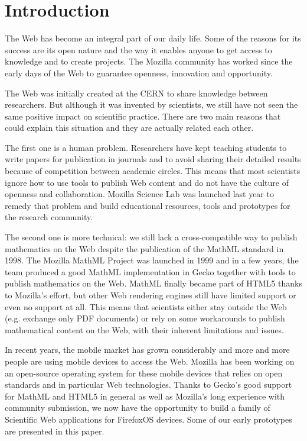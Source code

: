 \chapter*{Introduction}

The Web has become an integral part of our daily life. Some of the reasons for
its success are its open nature and the way it enables anyone to get access to
knowledge and to create projects. The Mozilla community has worked since
the early days of the Web to guarantee openness, innovation and opportunity.

The Web was initially created at the CERN to share knowledge between
researchers. But although it was invented by scientists, we still have not seen
the same positive impact on scientific practice. There are two main reasons that
could explain this situation and they are actually related each other.

The first one is a human problem. Researchers have kept teaching students
to write papers for publication in journals and to avoid sharing their detailed
results because of competition between academic circles. This means that most
scientists ignore
how to use tools to publish Web content and do not have the culture of openness
and collaboration. Mozilla Science Lab was launched last year to remedy that
problem and build educational resources, tools and prototypes for the research
community.

The second one is more technical:
we still lack a cross-compatible way to publish
mathematics on the Web despite the publication of the MathML standard in 1998.
The Mozilla MathML Project
was launched in 1999 and in a few years, the team produced a good MathML
implementation in Gecko together with tools to publish mathematics on the Web.
MathML finally
became part of HTML5 thanks to Mozilla's effort, but other Web rendering
engines still have limited support or even no support at all. This means that
scientists either stay outside the Web (e.g. exchange only PDF documents) or
rely on some workarounds to publish mathematical content on the Web, with
their inherent limitations and issues.

In recent years, the mobile market has grown considerably and more and more
people are using mobile devices to access the Web. Mozilla has been working
on an open-source operating system for these mobile devices that
relies on open standards and in particular Web technologies. Thanks to
Gecko's good support for MathML and HTML5 in general as well as
Mozilla's long experience with community submission, we now have the opportunity
to build a family of Scientific Web applications for FirefoxOS devices.
Some of our early prototypes are presented in this paper.

